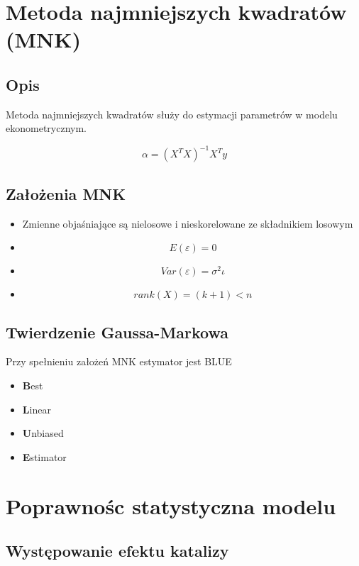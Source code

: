 \section{Metoda najmniejszych kwadratów (MNK)}\label{sec:mnk}

\subsection{Opis}\label{subsec:opis}
Metoda najmniejszych kwadratów służy do estymacji parametrów w modelu ekonometrycznym.

\[ \alpha = (X^{T}X)^{-1}X^{T}y \]

\subsection{Założenia MNK}\label{subsec:założenia-mnk}

\begin{itemize}
    \item Zmienne objaśniające są nielosowe i nieskorelowane ze składnikiem losowym
    \item \[E(\varepsilon) = 0\]
    \item \[Var(\varepsilon) = \sigma^2 \iota\]
    \item \[rank(X) = (k+1) <n\]
\end{itemize}

\subsection{Twierdzenie Gaussa-Markowa}\label{subsec:twierdzenie-gaussa-markowa}
Przy spełnieniu założeń MNK estymator jest BLUE
\begin{itemize}
    \item \textbf{B}est
    \item \textbf{L}inear
    \item \textbf{U}nbiased
    \item \textbf{E}stimator
\end{itemize}

\section {Poprawnośc statystyczna modelu}\label{sec:testy-statystyczne-modelu}

\subsection{Występowanie efektu katalizy}\label{subsec:występowanie-efektu-katalizy}

